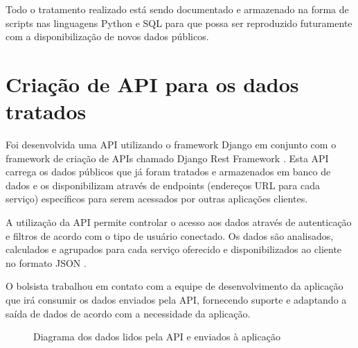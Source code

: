 \documentclass[12pt]{report}
\begin{document}
Todo o tratamento realizado está sendo documentado e armazenado na forma de scripts nas linguagens Python \cite{python} e SQL para que possa ser reproduzido futuramente com a disponibilização de novos dados públicos.

\section{Criação de API para os dados tratados}
Foi desenvolvida uma API \cite{api} utilizando o framework Django \cite{django} em conjunto com o framework de criação de APIs chamado Django Rest Framework \cite{drf}. Esta API carrega os dados públicos que já foram tratados e armazenados em banco de dados e os disponibilizam através de endpoints (endereços URL para cada serviço) específicos para serem acessados por outras aplicações clientes.

A utilização da API permite controlar o acesso aos dados através de autenticação e filtros de acordo com o tipo de usuário conectado. Os dados são analisados, calculados e agrupados para cada serviço oferecido e disponibilizados ao cliente no formato JSON \cite{json}.

O bolsista trabalhou em contato com a equipe de desenvolvimento da aplicação que irá consumir os dados enviados pela API, fornecendo suporte e adaptando a saída de dados de acordo com a necessidade da aplicação.


\begin{figure}[h!]
\centering
{}
\caption{Diagrama dos dados lidos pela API e enviados à aplicação}
\label{fig:api}
\end{figure}
\end{document}
